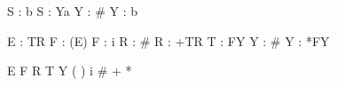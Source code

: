 S : b
S : Ya
Y : #
Y : b

E : TR
F : (E)
F : i
R : #
R : +TR
T : FY
Y : #
Y : *FY

E F R T Y
( ) i # + *

